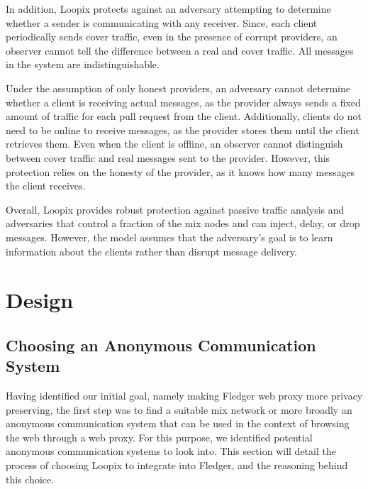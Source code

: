 \documentclass[a4paper,11pt,oneside]{report}
\begin{document}
In addition, Loopix protects against an adversary attempting to determine whether a sender is communicating with any receiver. Since, each client periodically sends cover traffic, even in the presence of corrupt providers, an observer cannot tell the difference between a real and cover traffic. All messages in the system are indistinguishable.

Under the assumption of only honest providers, an adversary cannot determine whether a client is receiving actual messages, as the provider always sends a fixed amount of traffic for each pull request from the client. Additionally, clients do not need to be online to receive messages, as the provider stores them until the client retrieves them. Even when the client is offline, an observer cannot distinguish between cover traffic and real messages sent to the provider. However, this protection relies on the honesty of the provider, as it knows how many messages the client receives.

Overall, Loopix provides robust protection against passive traffic analysis and adversaries that control a fraction of the mix nodes and can inject, delay, or drop messages. However, the model assumes that the adversary’s goal is to learn information about the clients rather than disrupt message delivery.

\chapter{Design}


\section{Choosing an Anonymous Communication System}
\label{sec:mixers}
Having identified our initial goal, namely making Fledger web proxy more privacy preserving, the first step was to find a suitable mix network or more broadly an anonymous communication system that can be used in the context of browsing the web through a web proxy. For this purpose, we identified potential anonymous communication systems to look into. This section will detail the process of choosing Loopix to integrate into Fledger, and the reasoning behind this choice.
\end{document}
